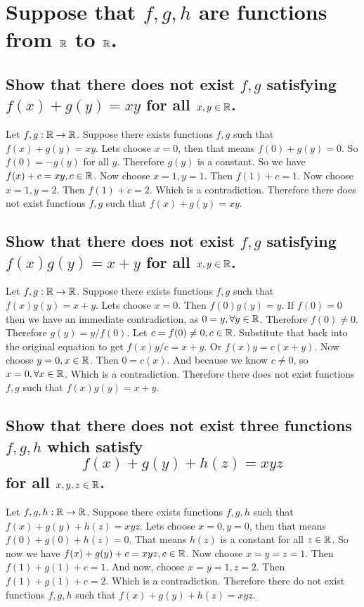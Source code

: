 \section{Suppose that $f,g,h$ are functions from $\mathbb{R}$ to $\mathbb{R}$.}
    \subsection{Show that there does not exist $f,g$ satisfying $f(x) + g(y) = xy$ for all $x,y \in \mathbb{R}$.}
        Let $f, g : \mathbb{R} \to \mathbb{R}$.
        Suppose there exists functions $f,g$ such that $f(x) + g(y) = xy$.
        Lets choose $x = 0$, then that means $f(0) + g(y) = 0$. 
        So $f(0) = -g(y)$ for all $y$.
        Therefore $g(y)$ is a constant.
        So we have $f(x) + c = xy, c\in \mathbb{R}$.
        Now choose $x = 1, y = 1$.
        Then $f(1) + c = 1$.
        Now choose $x = 1, y = 2$.
        Then $f(1) + c = 2$.
        Which is a contradiction.
        Therefore there does not exist functions $f, g$ such that $f(x) + g(y) = xy$.

    \subsection{Show that there does not exist $f,g$ satisfying $f(x)g(y) = x+y$ for all $x,y \in \mathbb{R}$.}
        Let $f, g : \mathbb{R} \to \mathbb{R}$.
        Suppose there exists functions $f,g$ such that $f(x)g(y) = x + y$.
        Lets choose $x = 0$.
        Then $f(0)g(y) = y$.
        If $f(0) = 0$ then we have an immediate contradiction,
        as $0 = y, \forall y \in \mathbb{R}$.
        Therefore $f(0) \neq 0$.
        Therefore $g(y) = y / f(0)$.
        Let $c = f(0) \neq 0, c \in \mathbb{R}$.
        Substitute that back into the original equation to get
        $f(x) y / c= x + y$.
        Or $f(x) y = c(x + y)$.
        Now choose $y = 0, x \in \mathbb{R}$.
        Then $0 = c(x)$.
        And because we know $c \neq 0$,
        so $x = 0, \forall x \in \mathbb{R}$.
        Which is a contradiction.
        Therefore there does not exist functions $f, g$ such that $f(x)g(y) = x + y$.
        

    \subsection{Show that there does not exist three functions $f,g,h$ which satisfy
        \[f(x) + g(y) + h(z) = xyz
            \]
        for all $x,y,z \in \mathbb{R}$.}

        Let $f, g, h : \mathbb{R} \to \mathbb{R}$.
        Suppose there exists functions $f,g,h$ such that $f(x) + g(y) + h(z) = xyz$.
        Lets choose $x = 0, y = 0$, then that means $f(0) + g(0) + h(z) = 0$. 
        That means $h(z)$ is a constant for all $z \in \mathbb{R}$.
        So now we have $f(x) + g(y) + c = xyz, c \in \mathbb{R}$.
        Now choose $x = y = z = 1$. 
        Then $f(1) + g(1) + c = 1$.
        And now, choose $ x = y = 1, z = 2$.
        Then $f(1) + g(1) + c = 2$.
        Which is a contradiction.
        Therefore there do not exist functions $f,g,h$ such that $f(x) + g(y) + h(z) = xyz$.